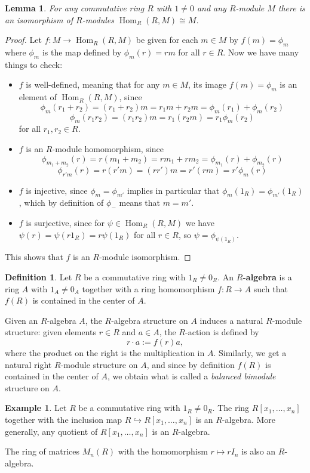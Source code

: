 \documentclass[12pt]{report}
\newtheorem{lemma}[theorem]{Lemma}
\numberwithin{equation}{section}
\numberwithin{theorem}{chapter}
\theoremstyle{definition}
\newtheorem{definition}[theorem]{Definition}
\newtheorem{example}[theorem]{Example}
\newtheorem*{basic properties}{Basic Properties}
\newtheorem*{Important Remark}{Important Remark}
\newcommand{\df}[1]{{\bf #1}\index{#1}}
\DeclareMathOperator{\Hom}{Hom}
\begin{document}
\begin{lemma} 
For any commutative ring $R$ with $1\neq 0$ and any $R$-module $M$ there is an isomorphism of $R$-modules $\Hom_R(R,M)\cong M$. 
\end{lemma}
\begin{proof}
Let $f\!:M\to \Hom_R(R,M)$ be given for each $m\in M$ by $f(m)=\phi_m$ where $\phi_m$ is the map defined by $\phi_m(r)=rm$ for all $r\in R$. Now we have many things to check:
\begin{itemize}[leftmargin=12pt]
\item $f$ is well-defined, meaning that for any $m\in M$, its image $f(m) = \phi_m$ is an element of $\Hom_R(R,M)$, since 
$$\phi_m(r_1+r_2)=(r_1+r_2)m=r_1m+r_2m=\phi_m(r_1)+\phi_m(r_2)$$
$$\phi_m(r_1r_2)=(r_1r_2)m=r_1(r_2m)=r_1\phi_m(r_2)$$
for all $r_1,r_2\in R$.
\item $f$ is an $R$-module homomorphism, since
$$\phi_{m_1+m_2}(r)=r(m_1+m_2)=rm_1+rm_2=\phi_{m_1}(r)+\phi_{m_2}(r)$$
$$\phi_{r'm}(r)=r(r'm)=(rr')m=r'(rm)=r'\phi_{m}(r)$$
\item $f$ is injective, since $\phi_m=\phi_{m'}$ implies in particular that $\phi_m(1_R)=\phi_{m'}(1_R)$, which by definition of $\phi_{-}$ means that $m=m'$.
\item $f$ is surjective, since for $\psi \in \Hom_R(R,M)$ we have $\psi(r)=\psi(r1_R)=r\psi(1_R)$ for all $r\in R$, so $\psi=\phi_{\psi(1_R)}$.
\end{itemize}
This shows that $f$ is an $R$-module isomorphism.
\end{proof}


\begin{definition}
	Let $R$ be a commutative ring with $1_R \neq 0_R$. An \df{$R$-algebra} is a ring $A$ with $1_A \neq 0_A$ together with a ring homomorphism $f\!: R \to A$ such that $f(R)$ is contained in the center of $A$.
\end{definition}


Given an $R$-algebra $A$, the $R$-algebra structure on $A$ induces a natural $R$-module structure: given elements $r \in R$ and $a \in A$, the $R$-action is defined by 
$$r \cdot a := f(r) a,$$
where the product on the right is the multiplication in $A$. Similarly, we get a natural right $R$-module structure on $A$, and since by definition $f(R)$ is contained in the center of $A$, we obtain what is called a \emph{balanced bimodule} structure on $A$.


\begin{example}
Let $R$ be a commutative ring with $1_R \neq 0_R$. The ring $R[x_1,\ldots, x_n]$ together with the inclusion map $R \hookrightarrow R[x_1,\ldots, x_n]$ is an $R$-algebra. More generally, any quotient of $R[x_1,\ldots, x_n]$ is an $R$-algebra.

The ring of matrices $M_n(R)$ with the homomorphism $r \mapsto r I_n$ is also an $R$-algebra. \end{example}
\end{document}
